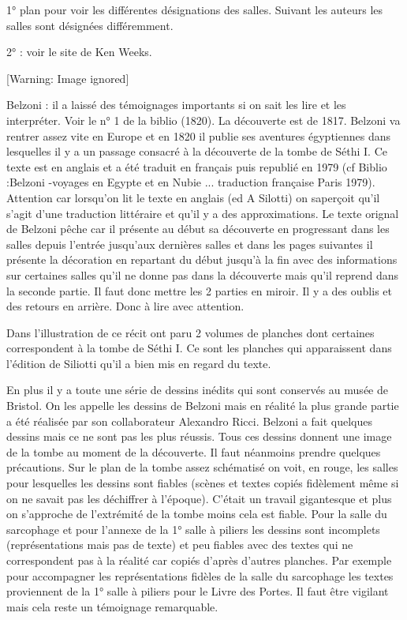 \documentclass{article}
\begin{document}
1° plan pour voir les différentes désignations des salles. Suivant les
auteurs les salles sont désignées différemment. 

2° : voir le site de Ken Weeks.

  [Warning: Image ignored] %
 

Belzoni : il a laissé des témoignages importants si on sait les lire et
les interpréter. Voir le n° 1 de la biblio (1820). La découverte est de
1817. Belzoni va rentrer assez vite en Europe et en 1820 il publie ses
aventures égyptiennes dans lesquelles il y a un passage consacré à la
découverte de la tombe de Séthi I. Ce texte est en anglais et a été
traduit en français puis republié en 1979 (cf Biblio :Belzoni -voyages
en Egypte et en Nubie ... traduction française Paris 1979). Attention
car lorsqu’on lit le texte en anglais (ed A Silotti) on
s{\textquotesingle}aperçoit qu’il s’agit d’une traduction littéraire et
qu’il y a des approximations. Le texte orignal de Belzoni pêche car il
présente au début sa découverte en progressant dans les salles depuis
l’entrée jusqu’aux dernières salles et dans les pages suivantes il
présente la décoration en repartant du début jusqu’à la fin avec des
informations sur certaines salles qu’il ne donne pas dans la découverte
mais qu’il reprend dans la seconde partie. Il faut donc mettre les 2
parties en miroir. Il y a des oublis et des retours en arrière. Donc à
lire avec attention.

Dans l’illustration de ce récit ont paru 2 volumes de planches dont
certaines correspondent à la tombe de Séthi I. Ce sont les planches qui
apparaissent dans l’édition de Siliotti qu’il a bien mis en regard du
texte. 

En plus il y  a toute une série de dessins inédits qui sont conservés au
musée de Bristol. On les appelle les dessins de Belzoni mais en réalité
la plus grande partie a été réalisée par son collaborateur Alexandro
Ricci. Belzoni a fait quelques dessins mais ce ne sont pas les plus
réussis. Tous ces dessins donnent une image de la tombe au moment de la
découverte. Il faut néanmoins prendre quelques précautions. Sur le plan
de la tombe assez schématisé on voit, en rouge, les salles pour
lesquelles les dessins sont fiables (scènes et textes copiés fidèlement
même si on ne savait pas les déchiffrer à l’époque). C’était un travail
gigantesque et plus on s’approche de l’extrémité de la tombe moins cela
est fiable. Pour la salle du sarcophage et pour l’annexe de la 1° salle
à piliers les dessins sont incomplets (représentations mais pas de
texte) et peu fiables avec des textes qui ne correspondent pas à la
réalité car copiés d’après d’autres planches. Par exemple pour
accompagner les représentations fidèles de la salle du sarcophage les
textes proviennent de la 1° salle à piliers pour le Livre des Portes.
Il faut être vigilant mais cela reste un témoignage remarquable.
\end{document}
